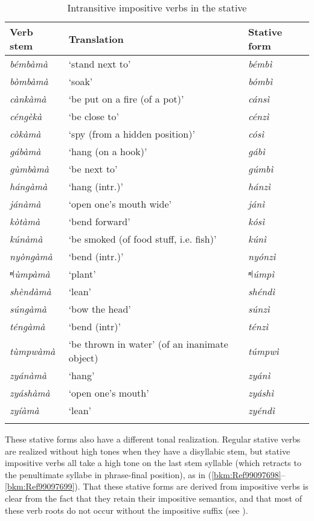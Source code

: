 \begin{table}
\label{bkm:Ref506903429}\caption{\label{tab:9:5}Intransitive impositive verbs in the stative}
\begin{tabularx}{\textwidth}{Xll}
\lsptoprule
Verb stem & Translation & Stative form\\
\midrule
\textit{bémbàmà} & ‘stand next to’ & \textit{bémbì}\\
\textit{bòmbàmà} & ‘soak’ & \textit{bómbì}\\
\textit{cànkàmà} & ‘be put on a fire (of a pot)’ & \textit{cánsì}\\
\textit{céngèkà} & ‘be close to’ & \textit{cénzì}\\
\textit{còkàmà} & ‘spy (from a hidden position)’ & \textit{cósì}\\
\textit{gábàmà} & ‘hang (on a hook)’ & \textit{gábì}\\
\textit{gùmbàmà} & ‘be next to’ & \textit{gúmbì}\\
\textit{hángàmà} & ‘hang (intr.)’ & \textit{hánzì}\\
\textit{jánàmà} & ‘open one’s mouth wide’ & \textit{jánì}\\
\textit{kòtàmà} & ‘bend forward’ & \textit{kósì}\\
\textit{kúnàmà} & ‘be smoked (of food stuff, i.e. fish)’ & \textit{kúnì}\\
\textit{nyòngàmà} & ‘bend (intr.)’ & \textit{nyónzì}\\
\textit{ⁿǀùmpàmà} & ‘plant’ & \textit{ⁿǀúmpì}\\
\textit{shèndàmà} & ‘lean’ & \textit{shéndì}\\
\textit{súngàmà} & ‘bow the head’ & \textit{súnzì}\\
\textit{téngàmà} & ‘bend (intr)’ & \textit{ténzì}\\
\textit{tùmpwàmà} & ‘be thrown in water’ (of an inanimate object) & \textit{túmpwì}\\
\textit{zyánàmà} & ‘hang’ & \textit{zyánì}\\
\textit{zyáshàmà} & ‘open one’s mouth’ & \textit{zyáshì}\\
\textit{zyíàmà} & ‘lean’ & \textit{zyéndì}\\
\lspbottomrule
\end{tabularx}
\end{table}

These stative forms also have a different tonal realization. Regular stative verbs are realized without high tones when they have a disyllabic stem, but stative impositive verbs all take a high tone on the last stem syllable (which retracts to the penultimate syllabe in phrase-final position), as in (\ref{bkm:Ref99097698}--\ref{bkm:Ref99097699}). That these stative forms are derived from impositive verbs is clear from the fact that they retain their impositive semantics, and that most of these verb roots do not occur without the impositive suffix (see ).

